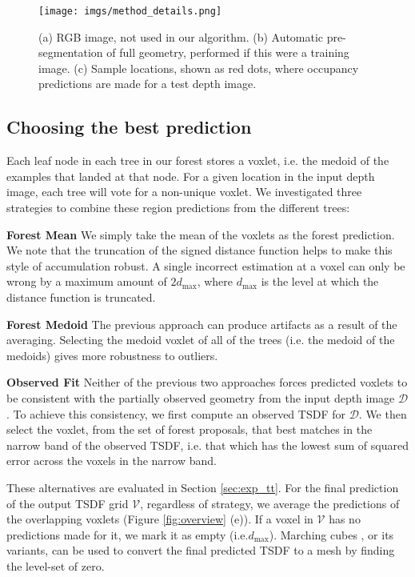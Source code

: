 \documentclass[10pt,twocolumn,letterpaper]{article}
\makeatletter
\renewcommand*{\ie}{i.e.\@\xspace}
\newcommand{\rgbdimage}{\mathcal{D}}
\newcommand{\voxelgrid}{\mathcal{V}}
\makeatother
\begin{document}
\begin{figure}[t]
     \texttt{[image: imgs/method\_details.png]}
         \caption{(a) RGB image, not used in our algorithm. (b) Automatic pre-segmentation of full geometry, performed if this were a training image. (c) Sample locations, shown as red dots, where occupancy predictions are made for a test depth image.}
    \label{fig:method_details}
    \vspace{-6pt}
\end{figure}

\subsection{Choosing the best prediction}
\label{sec:agg_predictions}
Each leaf node in each tree in our forest stores a voxlet, \ie the medoid of the examples that landed at that node.
For a given location in the input depth image, each tree will vote for a non-unique voxlet.
We investigated three strategies to combine these region predictions from the different trees:

\noindent\textbf{Forest Mean} We simply take the mean of the voxlets as the forest prediction.
We note that the truncation of the signed distance function helps to make this style of accumulation robust.
A single incorrect estimation at a voxel can only be wrong by a maximum amount of $2d_{\max}$, where $d_{\max}$ is the level at which the distance function is truncated.

\noindent\textbf{Forest Medoid} The previous approach can produce artifacts as a result of the averaging.
Selecting the medoid voxlet of all of the trees (\ie the medoid of the medoids) gives more robustness to outliers.

\noindent\textbf{Observed Fit} Neither of the previous two approaches forces predicted voxlets to be consistent with the partially observed geometry from the input depth image $\rgbdimage$.
To achieve this consistency, we first compute an observed TSDF for $\rgbdimage$.
We then select the voxlet, from the set of forest proposals, that best matches in the narrow band of the observed TSDF, \ie that which has the lowest sum of squared error across the voxels in the narrow band.

These alternatives are evaluated in Section \ref{sec:exp_tt}.
For the final prediction of the output TSDF grid $\voxelgrid$, regardless of strategy, we average the predictions of the overlapping voxlets (Figure \ref{fig:overview} (e)).
If a voxel in $\voxelgrid$ has no predictions made for it, we mark it as empty (\ie $d_{\max}$).
Marching cubes \cite{lorensen-siggraph-2013}, or its variants, can be used to convert the final predicted TSDF to a mesh by finding the level-set of zero.
\end{document}
